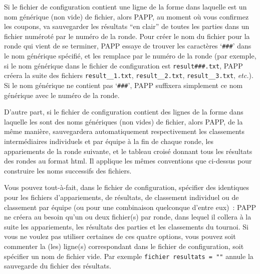 \documentclass[10pt]{article}
\begin{document}
 Si le fichier de configuration contient une ligne de la forme 
\medbreak
{}
\medbreak
\noindent dans laquelle  est un nom g\'en\'erique (non 
vide) de fichier, alors PAPP, au moment o\`u vous confirmez les 
coupons, va sauvegarder les r\'esultats ``en clair'' de toutes les 
parties dans un fichier num\'erot\'e par le num\'ero de la ronde.  
Pour cr\'eer le nom du fichier pour la ronde qui vient de se terminer, 
PAPP essaye de trouver les caract\`eres `\verb|###|' dans le nom 
g\'en\'erique sp\'ecifi\'e, et les remplace par le num\'ero de la 
ronde (par exemple, si le nom g\'en\'erique dans le fichier de 
configuration est \verb|result###.txt|, PAPP cr\'eera la suite des 
fichiers \verb|result__1.txt|, \verb|result__2.txt|, 
\verb|result__3.txt|, \emph{etc.}).  Si le nom g\'en\'erique ne 
contient pas `\verb|###|', PAPP suffixera simplement ce nom 
g\'en\'erique avec le num\'ero de la ronde.

D'autre part, si le fichier de configuration contient des lignes de la
forme 
\medbreak
{}
\medbreak
\noindent dans laquelle les  sont des noms g\'en\'eriques (non 
vides) de fichier, alors PAPP, de la m\^eme mani\`ere, sauvegardera 
automatiquement respectivement les classements interm\'ediaires individuels et par 
\'equipe \`a la fin de chaque ronde, les appariements de la ronde 
suivante, et le tableau crois\'e donnant tous les r\'esultats des rondes au format html.
Il applique les m\^emes conventions que ci-dessus pour  construire les noms successifs des fichiers.

Vous pouvez tout-\`a-fait, dans le fichier de configuration, 
sp\'ecifier des  identiques pour les fichiers 
d'appariements, de r\'esultats, de classement individuel ou de 
classement par \'equipe (ou pour une combinaison quelconque d'entre 
eux)~: PAPP ne cr\'eera au besoin qu'un ou deux fichier(s) par ronde, 
dans lequel il collera \`a la suite les appariements, les r\'esultats 
des parties et les classements du tournoi.  Si vous ne voulez pas 
utiliser certaines de ces quatre options, vous pouvez soit commenter la 
(les) ligne(s) correspondant dans le fichier de configuration, soit 
sp\'ecifier un nom de fichier vide.  Par exemple 
\hbox{\verb|fichier resultats = ""|} annule la sauvegarde du fichier 
des r\'esultats.
\end{document}
